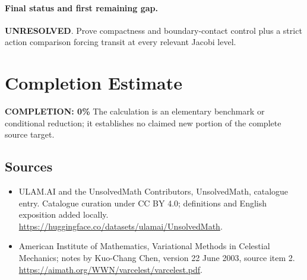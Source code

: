 \documentclass[11pt]{article}
\begin{document}
\paragraph{Final status and first remaining gap.}
\textbf{UNRESOLVED}. Prove compactness and boundary-contact control plus a strict action comparison forcing transit at every relevant Jacobi level.

\section{Completion Estimate}
\noindent\textbf{COMPLETION: 0\%}
The calculation is an elementary benchmark or conditional reduction; it establishes no claimed new portion of the complete source target.

\subsection{Sources}
\begin{itemize}
\item[\hypertarget{source:statement:1}{S1}] ULAM.AI and the UnsolvedMath Contributors, UnsolvedMath, catalogue entry. Catalogue curation under CC BY 4.0; definitions and English exposition added locally.
\url{https://huggingface.co/datasets/ulamai/UnsolvedMath}.
\item[\hypertarget{source:statement:2}{S2}] American Institute of Mathematics, Variational Methods in Celestial Mechanics; notes by Kuo-Chang Chen, version 22 June 2003, source item 2.
\url{https://aimath.org/WWN/varcelest/varcelest.pdf}.
\end{itemize}
\label{end:statement}
\end{document}
